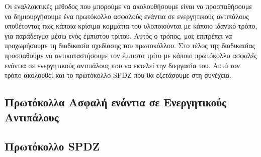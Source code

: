 Οι εναλλακτικές μέθοδος που μπορούμε να ακολουθήσουμε είναι να προσπαθήσουμε να δημιουργήσουμε ένα πρωτόκολλο ασφαλούς ενάντια σε ενεργητικούς αντιπάλους υποθέτοντας πως κάποια κρίσιμα κομμάτια του υλοποιούνται με κάποιο ιδανικό τρόπο, για παράδειγμα μέσω ενός έμπιστου τρίτου. Αυτός ο τρόπος, μας επιτρέπει να προχωρήσουμε τη διαδικασία σχεδίασης του πρωτοκόλλου. Στο τέλος της διαδικασίας προσπαθούμε να αντικαταστήσουμε τον έμπιστο τρίτο με κάποιο πρωτόκολλο ασφαλές ενάντια σε ενεργητικούς αντιπάλους που να εκτελεί την διεργασία του. Αυτό τον τρόπο ακολουθεί και το πρωτόκολλο SPDZ που θα εξετάσουμε στη συνέχεια.

\subsection{Πρωτόκολλα Ασφαλή ενάντια σε Ενεργητικούς Αντιπάλους}

\subsection{Πρωτόκολλο SPDZ}

